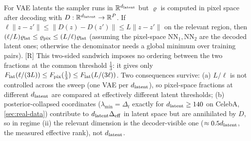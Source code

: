 \begin{remark}\label{rem:pixel}
For VAE latents the sampler runs in $\mathbb{R}^{d_{\mathrm{latent}}}$ but $\varrho$ is computed in pixel space after decoding with $D:\mathbb{R}^{d_{\mathrm{latent}}}\to\mathbb{R}^{P}$. If $\ell\|z-z'\|\le\|D(z)-D(z')\|\le L\|z-z'\|$ on the relevant region, then $(\ell/L)\varrho_{\rm lat}\le\varrho_{\rm pix}\le(L/\ell)\varrho_{\rm lat}$ (assuming the pixel-space $\mathrm{NN}_1,\mathrm{NN}_2$ are the decoded latent ones; otherwise the denominator needs a global minimum over training pairs). [R] This two-sided sandwich imposes no ordering between the two fractions at the common threshold $\tfrac13$: it gives only $F_{\rm lat}(\ell/(3L))\le F_{\rm pix}(\tfrac13)\le F_{\rm lat}(L/(3\ell))$. Two consequences survive: (a) $L/\ell$ is not controlled across the sweep (one VAE per $d_{\mathrm{latent}}$), so pixel-space fractions at different $d_{\mathrm{latent}}$ are compared at effectively different latent thresholds; (b) posterior-collapsed coordinates ($\lambda_{\min}=\Delta_t$ exactly for $d_{\mathrm{latent}}\ge140$ on CelebA, \cref{sec:real-data}) contribute to $d_{\mathrm{latent}}\Delta_{\rm eff}$ in latent space but are annihilated by $D$, so in regime (ii) the relevant dimension is the decoder-visible one ($\approx0.5d_{\mathrm{latent}}$, the measured effective rank), not $d_{\mathrm{latent}}$.
\end{remark}

